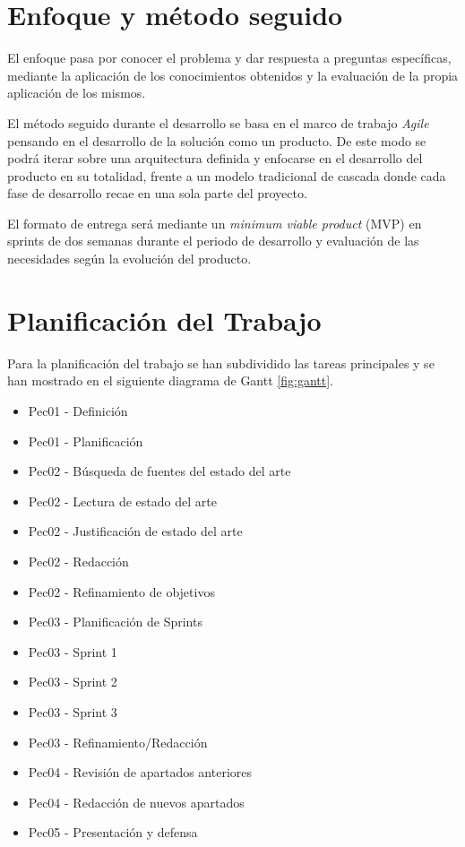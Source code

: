 \section{Enfoque y método seguido}
El enfoque pasa por conocer el problema y dar respuesta a preguntas específicas, mediante la aplicación de los conocimientos obtenidos y la evaluación de la propia aplicación de los mismos.  \par



El método seguido durante el desarrollo se basa en el marco de trabajo \textit{Agile} pensando en el desarrollo de la solución como un producto. De este modo se podrá iterar sobre una arquitectura definida y enfocarse en el desarrollo del producto en su totalidad, frente a un modelo tradicional de cascada donde cada fase de desarrollo recae en una sola parte del proyecto.



El formato de entrega será mediante un \textit{minimum viable product} (MVP) en sprints de dos semanas durante el periodo de desarrollo y evaluación de las necesidades según la evolución del producto.

\section{Planificación del Trabajo}

Para la planificación del trabajo se han subdividido las tareas principales y se han mostrado en el siguiente diagrama de Gantt \ref{fig:gantt}.

\begin{itemize}
    \item Pec01 - Definición
    \item Pec01 - Planificación
    \item Pec02 - Búsqueda de fuentes del estado del arte
    \item Pec02 - Lectura de estado del arte
    \item Pec02 - Justificación de estado del arte
    \item Pec02 - Redacción
    \item Pec02 - Refinamiento de objetivos
    \item Pec03 - Planificación de Sprints
    \item Pec03 - Sprint 1
    \item Pec03 - Sprint 2
    \item Pec03 - Sprint 3
    \item Pec03 - Refinamiento/Redacción
    \item Pec04 - Revisión de apartados anteriores
    \item Pec04 - Redacción de nuevos apartados
    \item Pec05 - Presentación y defensa
\end{itemize}



